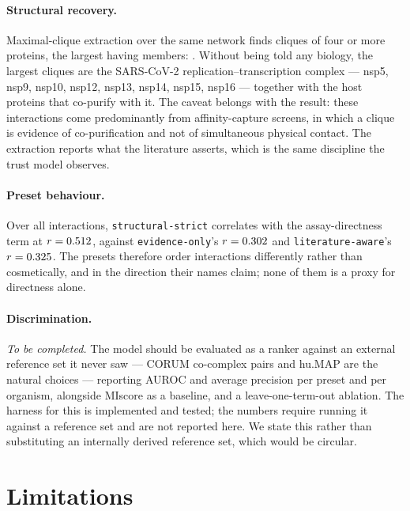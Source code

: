 \documentclass[conference]{IEEEtran}
\begin{document}
\paragraph{Structural recovery.} Maximal-clique extraction over the same network finds
\CovCliques{} cliques of four or more proteins, the largest having \CovLargestClique{}
members: \CovLargestCliqueMembers{}. Without being told any biology, the largest cliques
are the SARS-CoV-2 replication--transcription complex --- nsp5, nsp9, nsp10, nsp12,
nsp13, nsp14, nsp15, nsp16 --- together with the host proteins that co-purify with it.
The caveat belongs with the result: these interactions come predominantly from
affinity-capture screens, in which a clique is evidence of co-purification and not of
simultaneous physical contact. The extraction reports what the literature asserts, which
is the same discipline the trust model observes.

\paragraph{Preset behaviour.} Over all \CovInteractions{} interactions,
\texttt{structural-strict} correlates with the assay-directness term at
$r = 0.512$, against \texttt{evidence-only}'s $r = 0.302$ and
\texttt{literature-aware}'s $r = 0.325$. The presets therefore order
interactions differently rather than cosmetically, and in the direction their names
claim; none of them is a proxy for directness alone.

\paragraph{Discrimination.} \emph{To be completed.} The model should be evaluated as a
ranker against an external reference set it never saw --- CORUM co-complex pairs
\cite{corum} and hu.MAP \cite{humap} are the natural choices --- reporting AUROC and
average precision per preset and per organism, alongside MIscore \cite{miscore} as a
baseline, and a leave-one-term-out ablation. The harness for this is implemented and
tested; the numbers require running it against a reference set and are not reported
here. We state this rather than substituting an internally derived reference set, which
would be circular.

\section{Limitations}
\end{document}
